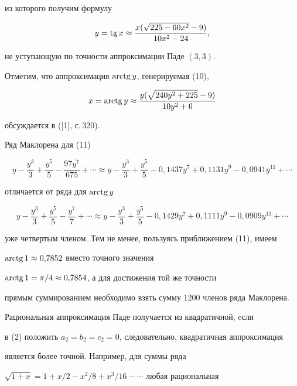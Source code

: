 из которого получим формулу 


$$


y=\tg{x}\approx\frac{x(\sqrt{225-60x^2}-9)}{10x^2-24},


$$ 


не уступающую по точности аппроксимации Паде $(3,3)$. 


Отметим, что аппроксимация $\operatorname{arctg}{y}$, генерируемая (10),  


\begin{equation}


x=\arctg y\approx\frac{y(\sqrt{240y^2+225}-9)}{10y^2+6}


\end{equation}


обсуждается в ([1], с.\,320). 


Ряд Маклорена для (11) 


$$


y-\frac{y^3}{3}+\frac{y^5}{5}-\frac{97y^7}{675}+\dotsb


\approx y-\frac{y^3}{3}+\frac{y^5}{5}-0{,}1437y^7+0{,}1131y^9


-0{,}0941y^{11}+\dotsb


$$ 


отличается от ряда для $\operatorname{arctg} y$ 


$$


y-\frac{y^3}{3}+\frac{y^5}{5}-\frac{y^7}{7}+\dotsb


\approx y-\frac{y^3}{3}+\frac{y^5}{5}-0{,}1429y^7+0{,}1111y^9


-0{,}0909y^{11}+\dotsb


$$ 


уже четвертым членом. Тем не менее, пользуясь приближением (11), имеем 


$\operatorname{arctg} 1\approx 0{,}7852$ вместо точного значения 


$\operatorname{arctg} 1=\pi/4\approx 0{,}7854$, а для достижения той же точности 


прямым суммированием необходимо взять сумму 1200 членов ряда Маклорена. 





Рациональная аппроксимация Паде получается из квадратичной, eсли 


в (2) положить $a_2=b_2=c_2=0$, следовательно, квадратичная аппроксимация 


является более точной. Например, для суммы ряда 


$\sqrt{1+x}=1+x/2-x^2/8+x^3/16-\dotsb$ любая рациональная 


